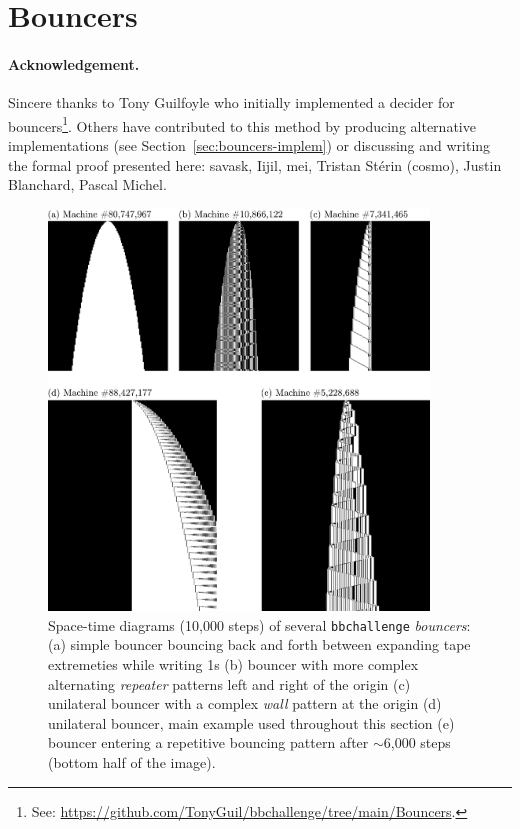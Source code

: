 
\section{Bouncers}\label{sec:bouncers}

\paragraph{Acknowledgement.}  Sincere thanks to Tony Guilfoyle who initially implemented a decider for bouncers\footnote{See: \url{https://github.com/TonyGuil/bbchallenge/tree/main/Bouncers}.}.
Others have contributed to this method by producing alternative implementations (see Section~\ref{sec:bouncers-implem}) or discussing and writing the formal proof presented here: savask, Iijil, mei, Tristan Stérin (cosmo), Justin Blanchard, Pascal Michel.


\begin{figure}[h!]
    \centering
    \includegraphics*[width=0.9\textwidth]{figures/bouncers/bouncers.pdf}
    \caption{Space-time diagrams (10,000 steps) of several \texttt{bbchallenge} \textit{bouncers}: (a) simple bouncer bouncing back and forth between expanding tape extremeties while writing 1s (b) bouncer with more complex alternating \textit{repeater} patterns left and right of the origin (c) unilateral bouncer with a complex \textit{wall} pattern at the origin (d) unilateral bouncer, main example used throughout this section (e) bouncer entering a repetitive bouncing pattern after $\sim$6,000 steps (bottom half of the image).}\label{fig:bouncers}
\end{figure}

